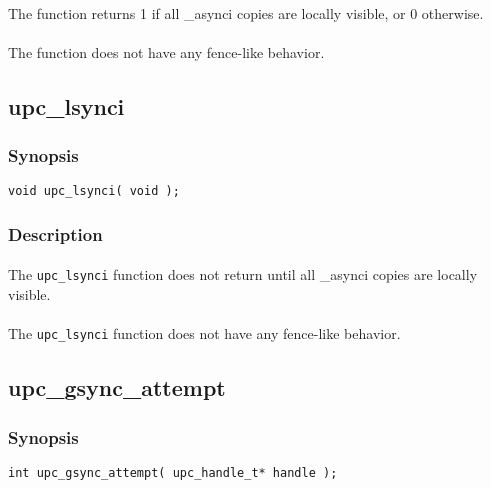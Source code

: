 \documentclass[10pt]{article}
\begin{document}
\paragraph{} The \function{} function returns 1 if all \_asynci copies are
locally visible, or 0 otherwise.

\paragraph{} The \function{} function does not have any fence-like behavior.

\subsection{upc\_lsynci}
\def\function{{\tt upc\_lsynci}}

\subsubsection{Synopsis}

\begin{verbatim}
void upc_lsynci( void );
\end{verbatim}

\subsubsection{Description}

\paragraph{} The \function{} function does not return until all \_asynci copies
are locally visible.

\paragraph{} The \function{} function does not have any fence-like behavior.

\newpage
\subsection{upc\_gsync\_attempt}
\def\function{{\tt upc\_gsync\_attempt}}

\subsubsection{Synopsis}

\begin{verbatim}
int upc_gsync_attempt( upc_handle_t* handle ); 
\end{verbatim}
\end{document}
